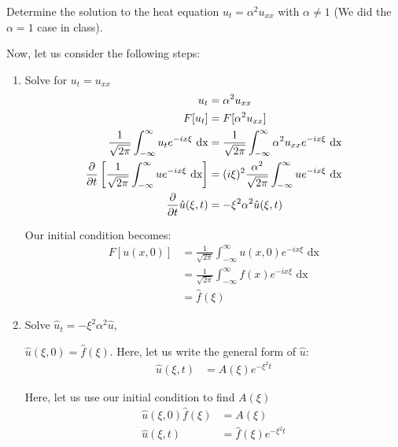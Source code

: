 \item Determine the solution to the heat equation $u_t = \alpha^2 u_{xx}$ with $\alpha \neq 1$ (We did the $\alpha = 1$ case in class).
\bigbreak

Now, let us consider the following steps:
%
\begin{enumerate}
  \item Solve for $u_t = u_{xx}$
  \begin{align}
    u_t & = \alpha^2 u_{xx}\\
    F[u_t] & = F[\alpha^2 u_{xx}]\\
    \frac{1}{\sqrt{2 \pi}} \int^\infty_{-\infty} u_t e^{-i x \xi} \text{ dx} & = \frac{1}{\sqrt{2 \pi}} \int^\infty_{-\infty} \alpha^2 u_{xx} e^{-i x \xi} \text{ dx}\\
    \frac{\partial}{\partial t} \left[ \frac{1}{\sqrt{2 \pi}} \int^\infty_{-\infty} u e^{-i x \xi} \text{ dx} \right]
    & = (i \xi)^2 \frac{\alpha^2}{\sqrt{2 \pi}} \int^\infty_{-\infty} u e^{-i x \xi} \text{ dx}\\
    \frac{\partial}{\partial t} \hat u(\xi, t) & = - \xi^2 \alpha^2 \hat u(\xi, t)
  \end{align}

  Our initial condition becomes:
  \begin{align}
    F[u(x, 0)] & = \frac{1}{\sqrt{2 \pi}} \int^\infty_{-\infty} u(x, 0) e^{-i x \xi} \text{ dx}\\
    & = \frac{1}{\sqrt{2 \pi}} \int^\infty_{-\infty} f(x) e^{-i x \xi} \text{ dx}\\
    & = \hat f(\xi)
  \end{align}
  \item Solve $\hat u_t = -\xi^2 \alpha^2 \hat u$,

  $\hat u(\xi, 0) = \hat f(\xi)$. Here, let us write the general form of $\hat u$:
  \begin{align}
    \hat u(\xi, t) & = A(\xi) e^{- \xi^2 t}
  \end{align}

  Here, let us use our initial condition to find $A(\xi)$
  \begin{align}
    \hat u (\xi, 0) \hat f(\xi) & = A(\xi)\\
    \hat u(\xi, t) & = \hat f(\xi) e^{-\xi^2 t}
  \end{align}


\end{enumerate}
